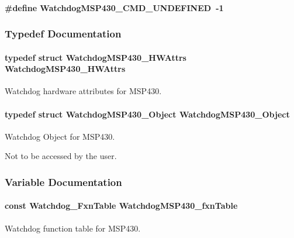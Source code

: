\paragraph[{Watchdog\-M\-S\-P430\-\_\-\-C\-M\-D\-\_\-\-U\-N\-D\-E\-F\-I\-N\-E\-D}]{\setlength{\rightskip}{0pt plus 5cm}\#define Watchdog\-M\-S\-P430\-\_\-\-C\-M\-D\-\_\-\-U\-N\-D\-E\-F\-I\-N\-E\-D~-\/1}\label{_watchdog_m_s_p430_8h_a513f6cf0d1683de949d8ec8079d5470c}


\subsubsection{Typedef Documentation}
\paragraph[{Watchdog\-M\-S\-P430\-\_\-\-H\-W\-Attrs}]{\setlength{\rightskip}{0pt plus 5cm}typedef struct {\bf Watchdog\-M\-S\-P430\-\_\-\-H\-W\-Attrs}  {\bf Watchdog\-M\-S\-P430\-\_\-\-H\-W\-Attrs}}\label{_watchdog_m_s_p430_8h_af63bbbf564e9c87866b479a863d641b0}


Watchdog hardware attributes for M\-S\-P430. 

\paragraph[{Watchdog\-M\-S\-P430\-\_\-\-Object}]{\setlength{\rightskip}{0pt plus 5cm}typedef struct {\bf Watchdog\-M\-S\-P430\-\_\-\-Object}  {\bf Watchdog\-M\-S\-P430\-\_\-\-Object}}\label{_watchdog_m_s_p430_8h_a4a9f55d973176fc4959cd62a5e8a1871}


Watchdog Object for M\-S\-P430. 

Not to be accessed by the user. 

\subsubsection{Variable Documentation}
\paragraph[{Watchdog\-M\-S\-P430\-\_\-fxn\-Table}]{\setlength{\rightskip}{0pt plus 5cm}const {\bf Watchdog\-\_\-\-Fxn\-Table} Watchdog\-M\-S\-P430\-\_\-fxn\-Table}\label{_watchdog_m_s_p430_8h_ad70837d4fca74e7271df9b79a7dc3092}


Watchdog function table for M\-S\-P430. 

